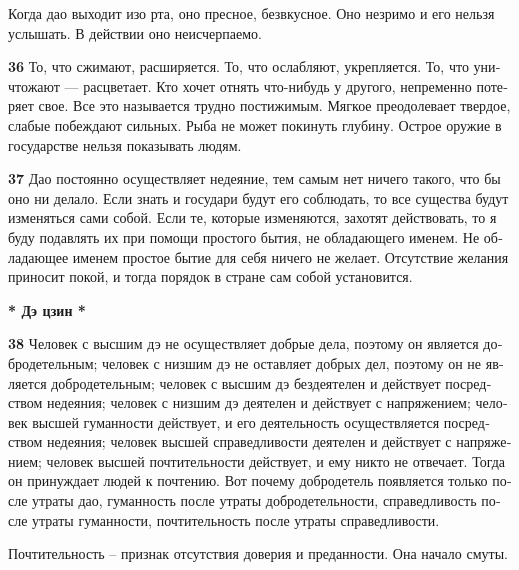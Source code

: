 \documentclass[a4paper]{article}
\begin{document}
{
Когда дао выходит изо рта, оно пресное, безвкусное. Оно незримо и его нельзя услышать. В действии оно неисчерпаемо.}


\bigskip

{\ttfamily
\foreignlanguage{russian}{\textrm{\textbf{36}}}\foreignlanguage{russian}{\textrm{ То, что сжимают, расширяется. То, что
ослабляют, укрепляется. То, что уничтожают — расцветает. Кто хочет отнять что-нибудь у другого, непременно потеряет
свое. Все это называется трудно постижимым. Мягкое преодолевает твердое, слабые побеждают сильных. Рыба не может
покинуть глубину. Острое оружие в государстве нельзя показывать людям.}}}

{\ttfamily
\foreignlanguage{russian}{\textrm{\textbf{37}}}\foreignlanguage{russian}{\textrm{ Дао постоянно осуществляет недеяние,
тем самым нет ничего такого, что бы оно ни делало. Если знать и государи будут его соблюдать, то все существа будут
изменяться сами собой. Если те, которые изменяются, захотят действовать, то я буду подавлять их при помощи простого
бытия, не обладающего именем. Не обладающее именем простое бытие для себя ничего не желает. Отсутствие желания приносит
покой, и тогда порядок в стране сам собой установится.}}}


\bigskip

{\centering{}\ttfamily
\foreignlanguage{russian}{\textrm{\textbf{* Дэ цзин *}}}
\par}


\bigskip

{\ttfamily
\foreignlanguage{russian}{\textrm{\textbf{38}}}\foreignlanguage{russian}{\textrm{ Человек с высшим дэ не осуществляет
добрые дела, поэтому он является добродетельным; человек с низшим дэ не оставляет добрых дел, поэтому он не является
добродетельным; человек с высшим дэ бездеятелен и действует посредством недеяния; человек с низшим дэ деятелен и
действует с напряжением; человек высшей гуманности действует, и его деятельность осуществляется посредством недеяния;
человек высшей справедливости деятелен и действует с напряжением; человек высшей почтительности действует, и ему никто
не отвечает. Тогда он принуждает людей к почтению. Вот почему добродетель появляется только после утраты дао,
гуманность после утраты добродетельности, справедливость после утраты гуманности, почтительность после утраты
справедливости.}}}

{
Почтительность – признак отсутствия доверия и преданности. Она начало смуты.}
\end{document}
